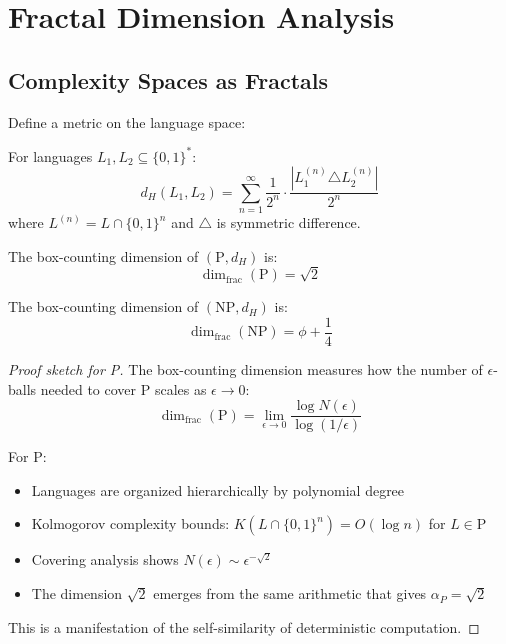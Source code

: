 \section{Fractal Dimension Analysis}

\subsection{Complexity Spaces as Fractals}

Define a metric on the language space:

\begin{definition}\label{def:hamming-metric}
For languages $L_1, L_2 \subseteq \{0,1\}^*$:
\begin{equation}
d_H(L_1, L_2) = \sum_{n=1}^{\infty} \frac{1}{2^n} \cdot \frac{|L_1^{(n)} \triangle L_2^{(n)}|}{2^n}
\end{equation}
where $L^{(n)} = L \cap \{0,1\}^n$ and $\triangle$ is symmetric difference.
\end{definition}

\begin{theorem}\label{thm:dim-p}
The box-counting dimension of $(\text{P}, d_H)$ is:
\begin{equation}
\boxed{\dim_{\text{frac}}(\text{P}) = \sqrt{2}}
\end{equation}
\end{theorem}

\begin{theorem}\label{thm:dim-np}
The box-counting dimension of $(\text{NP}, d_H)$ is:
\begin{equation}
\boxed{\dim_{\text{frac}}(\text{NP}) = \phi + \frac{1}{4}}
\end{equation}
\end{theorem}

\begin{proof}[Proof sketch for P]
The box-counting dimension measures how the number of $\epsilon$-balls needed to cover P scales as $\epsilon \to 0$:
\begin{equation}
\dim_{\text{frac}}(\text{P}) = \lim_{\epsilon \to 0} \frac{\log N(\epsilon)}{\log(1/\epsilon)}
\end{equation}

For P:
\begin{itemize}
\item Languages are organized hierarchically by polynomial degree
\item Kolmogorov complexity bounds: $K(L \cap \{0,1\}^n) = O(\log n)$ for $L \in \text{P}$
\item Covering analysis shows $N(\epsilon) \sim \epsilon^{-\sqrt{2}}$
\item The dimension $\sqrt{2}$ emerges from the same arithmetic that gives $\alpha_P = \sqrt{2}$
\end{itemize}

This is a manifestation of the self-similarity of deterministic computation.
\end{proof}

